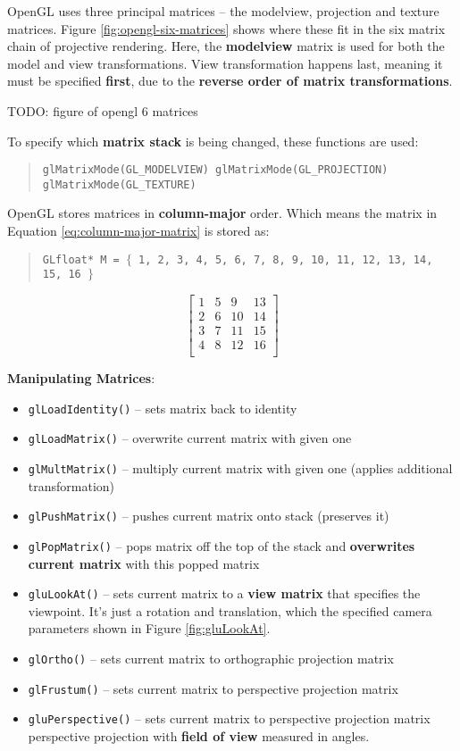 \documentclass{article}
\begin{document}
OpenGL uses three principal matrices -- the modelview, projection and texture matrices. Figure \ref{fig:opengl-six-matrices} shows where these fit in the six matrix chain of projective rendering. Here, the \textbf{modelview} matrix is used for both the model and view transformations. View transformation happens last, meaning it must be specified \textbf{first}, due to the \textbf{reverse order of matrix transformations}. 

TODO: figure of opengl 6 matrices

To specify which \textbf{matrix stack} is being changed, these functions are used:
\begin{quote}
\texttt{glMatrixMode(GL\_MODELVIEW)
glMatrixMode(GL\_PROJECTION)
glMatrixMode(GL\_TEXTURE)
}
\end{quote}

OpenGL stores matrices in \textbf{column-major} order. Which means the matrix in Equation \ref{eq:column-major-matrix} is stored as:
\begin{quote}
	\texttt{GLfloat* M = $\lbrace$ 1, 2, 3, 4, 5, 6, 7, 8, 9, 10, 11, 12, 13, 14, 15, 16 $\rbrace$ }
\end{quote}
\begin{equation}
	\left[ \begin{matrix}
	1 & 5 & 9 & 13 \\
	2 & 6 & 10 & 14 \\
	3 & 7 & 11 & 15 \\
	4 & 8 & 12 & 16 \\
	\end{matrix} \right]
\end{equation}

\textbf{Manipulating Matrices}:
\begin{itemize}
	\item \texttt{glLoadIdentity()} -- sets matrix back to identity
	\item \texttt{glLoadMatrix()} -- overwrite current matrix with given one
	\item \texttt{glMultMatrix()} -- multiply current matrix with given one (applies additional transformation)
	\item \texttt{glPushMatrix()} -- pushes current matrix onto stack (preserves it)
	\item \texttt{glPopMatrix()} -- pops matrix off the top of the stack and \textbf{overwrites current matrix} with this popped matrix
	\item \texttt{gluLookAt()} -- sets current matrix to a \textbf{view matrix} that specifies the viewpoint. It's just a rotation and translation, which the specified camera parameters shown in Figure \ref{fig:gluLookAt}.
	\item \texttt{glOrtho()} -- sets current matrix to orthographic projection matrix
	\item \texttt{glFrustum()} -- sets current matrix to perspective projection matrix
	\item \texttt{gluPerspective()} -- sets current matrix to perspective projection matrix perspective projection with \textbf{field of view} measured in angles.
\end{itemize}
\end{document}

